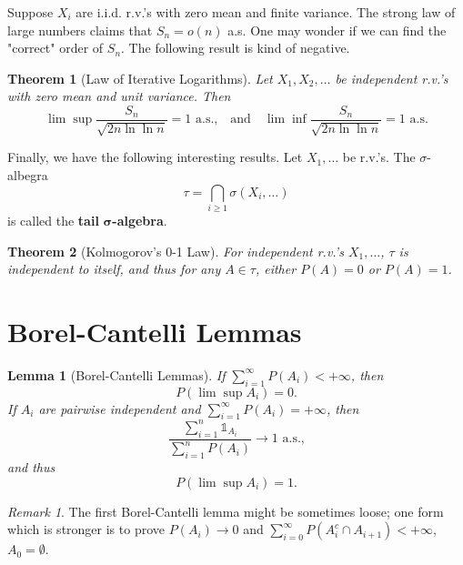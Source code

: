 \documentclass[openany]{book}
\newtheorem{lemma}{Lemma}[chapter]
\newtheorem{theorem}{Theorem}[chapter]
\theoremstyle{definition}
\theoremstyle{remark}
\newtheorem*{remark}{Remark}
\begin{document}
Suppose $X_i$ are i.i.d. r.v.'s with zero mean and finite variance. The strong law of large numbers claims that $S_n=o(n)$ a.s. One may wonder if we can find the "correct" order of $S_n$. The following result is kind of negative.
\begin{theorem}[Law of Iterative Logarithms]
    Let $X_1,X_2,\ldots$ be independent r.v.'s with zero mean and unit variance. Then
    \begin{equation*}
        \lim\sup\frac{S_n}{\sqrt{2n\ln\ln n}}=1\textrm{ a.s.,}\quad\textrm{and}\quad\lim\inf\frac{S_n}{\sqrt{2n\ln\ln n}}=1\textrm{ a.s.}
    \end{equation*}
\end{theorem}

Finally, we have the following interesting results. Let $X_1,\ldots$ be r.v.'s. The $\sigma$-albegra
\begin{equation*}
    \tau=\bigcap_{i\ge1}\sigma\left(X_i,\ldots\right)
\end{equation*}
is called the \textbf{tail} $\boldsymbol{\sigma}$\textbf{-algebra}.
\begin{theorem}[Kolmogorov's 0-1 Law]
    For independent r.v.'s $X_1,\ldots$, $\tau$ is independent to itself, and thus for any $A\in\tau$, either $P(A)=0$ or $P(A)=1$.
\end{theorem}

\section{Borel-Cantelli Lemmas}\label{sec:BorelCantelli}
\begin{lemma}[Borel-Cantelli Lemmas]
    If $\sum_{i=1}^{\infty}P(A_i)<+\infty$, then
    \begin{equation*}
        P\left(\lim\sup A_i\right)=0.
    \end{equation*}
    If $A_i$ are pairwise independent and $\sum_{i=1}^{\infty}P(A_i)=+\infty$, then
    \begin{equation*}
        \frac{\sum_{i=1}^{n}\mathds{1}_{A_i}}{\sum_{i=1}^{n}P(A_i)}\to1\textrm{ a.s.,}
    \end{equation*}
    and thus
    \begin{equation*}
        P\left(\lim\sup A_i\right)=1.
    \end{equation*}
\end{lemma}
\begin{remark}
    The first Borel-Cantelli lemma might be sometimes loose; one form which is stronger is to prove $P(A_i)\to0$ and $\sum_{i=0}^{\infty}P\left(A_i^c\cap A_{i+1}\right)<+\infty$, $A_0=\emptyset$.
\end{remark}
\end{document}
